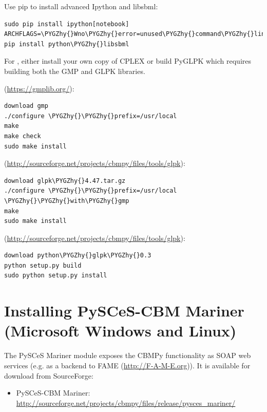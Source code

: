 \documentclass[a4paper,11pt,english]{sphinxmanual}
\def\PYGZhy{\char`\-}
\begin{document}
Use pip to install advanced Ipython and libsbml:

\begin{Verbatim}[commandchars=\\\{\}]
sudo pip install ipython[notebook]
ARCHFLAGS=\PYGZhy{}Wno\PYGZhy{}error=unused\PYGZhy{}command\PYGZhy{}line\PYGZhy{}argument\PYGZhy{}hard\PYGZhy{}error\PYGZhy{}in\PYGZhy{}future  pip install python\PYGZhy{}libsbml
\end{Verbatim}

For , either install your own copy of CPLEX or build PyGLPK which requires building both the GMP and GLPK libraries.

 (\href{https://gmplib.org/}{https://gmplib.org/}):

\begin{Verbatim}[commandchars=\\\{\}]
download gmp
./configure \PYGZhy{}\PYGZhy{}prefix=/usr/local
make
make check
sudo make install
\end{Verbatim}

  (\href{http://sourceforge.net/projects/cbmpy/files/tools/glpk}{http://sourceforge.net/projects/cbmpy/files/tools/glpk}):

\begin{Verbatim}[commandchars=\\\{\}]
download glpk\PYGZhy{}4.47.tar.gz
./configure \PYGZhy{}\PYGZhy{}prefix=/usr/local \PYGZhy{}\PYGZhy{}with\PYGZhy{}gmp
make
sudo make install
\end{Verbatim}

 (\href{http://sourceforge.net/projects/cbmpy/files/tools/glpk}{http://sourceforge.net/projects/cbmpy/files/tools/glpk}):

\begin{Verbatim}[commandchars=\\\{\}]
download python\PYGZhy{}glpk\PYGZhy{}0.3
python setup.py build
sudo python setup.py install
\end{Verbatim}


\section{Installing PySCeS-CBM Mariner (Microsoft Windows and Linux)}
\label{install_doc:installing-pysces-cbm-mariner-microsoft-windows-and-linux}
The PySCeS Mariner module exposes the CBMPy functionality as SOAP
web services (e.g. as a backend to FAME (\href{http://F-A-M-E.org}{http://F-A-M-E.org})). It is available for download from SourceForge:
\begin{itemize}
\item {} 
PySCeS-CBM Mariner: \href{http://sourceforge.net/projects/cbmpy/files/release/pysces\_mariner/}{http://sourceforge.net/projects/cbmpy/files/release/pysces\_mariner/}

\end{itemize}
\end{document}
